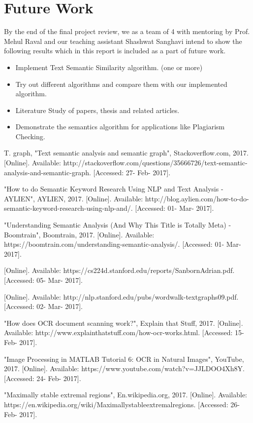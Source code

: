 \documentclass[journal, a4paper]{IEEEtran}
\begin{document}
\section{Future Work}
By the end of the final project review, we as a team of 4 with mentoring by Prof. Mehul Raval and our teaching assistant Shashwat Sanghavi intend to show the following results which in this report is included as a part of future work. 
\begin{itemize}
\item Implement Text Semantic Similarity algorithm. (one or more)
\item Try out different algorithms and compare them with our implemented algorithm.
\item Literature Study of papers, thesis and related articles.
\item Demonstrate the semantics algorithm for applications like Plagiarism Checking. 
\end{itemize}
\begin{thebibliography}{5}
 T.  graph, "Text semantic analysis and semantic graph", Stackoverflow.com, 2017. [Online]. 
Available: http://stackoverflow.com/questions/35666726/text-semantic-analysis-and-semantic-graph. [Accessed: 27- Feb- 2017].

 "How to do Semantic Keyword Research Using NLP and Text Analysis - AYLIEN", AYLIEN, 2017. [Online].
Available: http://blog.aylien.com/how-to-do-semantic-keyword-research-using-nlp-and/. [Accessed: 01- Mar- 2017].

"Understanding Semantic Analysis (And Why This Title is Totally Meta) - Boomtrain", Boomtrain, 2017. [Online].
Available: https://boomtrain.com/understanding-semantic-analysis/. [Accessed: 01- Mar- 2017].

[Online]. Available: https://cs224d.stanford.edu/reports/SanbornAdrian.pdf. [Accessed: 05- Mar- 2017].

[Online]. Available: http://nlp.stanford.edu/pubs/wordwalk-textgraphs09.pdf. [Accessed: 02- Mar- 2017].

"How does OCR document scanning work?", Explain that Stuff, 2017. [Online]. 
Available: http://www.explainthatstuff.com/how-ocr-works.html. [Accessed: 15- Feb- 2017].

"Image Processing in MATLAB Tutorial 6: OCR in Natural Images", YouTube, 2017. [Online].
Available: https://www.youtube.com/watch?v=JJLDOO4Xh8Y. [Accessed: 24- Feb- 2017].

"Maximally stable extremal regions", En.wikipedia.org, 2017. [Online]. 
Available: https://en.wikipedia.org/wiki/Maximallystableextremalregions. [Accessed: 26- Feb- 2017].

\end{thebibliography}
\end{document}
